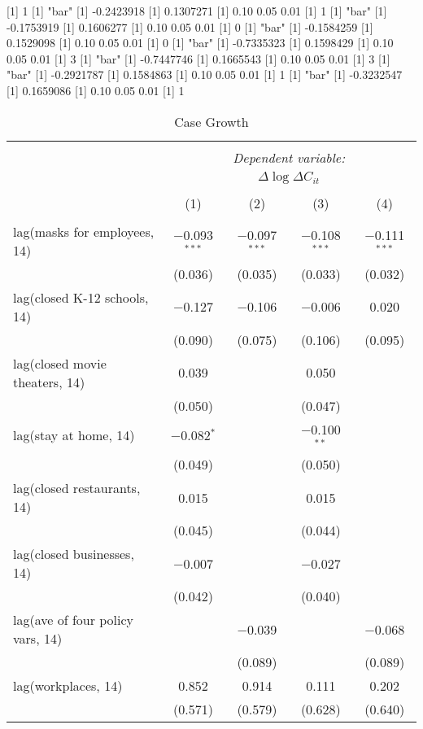 [1] 1
[1] "bar"
[1] -0.2423918
[1] 0.1307271
[1] 0.10 0.05 0.01
[1] 1
[1] "bar"
[1] -0.1753919
[1] 0.1606277
[1] 0.10 0.05 0.01
[1] 0
[1] "bar"
[1] -0.1584259
[1] 0.1529098
[1] 0.10 0.05 0.01
[1] 0
[1] "bar"
[1] -0.7335323
[1] 0.1598429
[1] 0.10 0.05 0.01
[1] 3
[1] "bar"
[1] -0.7447746
[1] 0.1665543
[1] 0.10 0.05 0.01
[1] 3
[1] "bar"
[1] -0.2921787
[1] 0.1584863
[1] 0.10 0.05 0.01
[1] 1
[1] "bar"
[1] -0.3232547
[1] 0.1659086
[1] 0.10 0.05 0.01
[1] 1

\begin{table}[!htbp] \centering 
  \caption{Case Growth} 
  \label{} 
\begin{tabular}{@{\extracolsep{1pt}}lcccc} 
\\[-1.8ex]\hline 
\hline \\[-1.8ex] 
 & \multicolumn{4}{c}{\textit{Dependent variable:}} \\ 
\cline{2-5} 
 & \multicolumn{4}{c}{$\Delta \log \Delta C_{it}$} \\ 
\\[-1.8ex] & (1) & (2) & (3) & (4)\\ 
\hline \\[-1.8ex] 
 lag(masks for employees, 14) & $-$0.093$^{***}$ & $-$0.097$^{***}$ & $-$0.108$^{***}$ & $-$0.111$^{***}$ \\ 
  & (0.036) & (0.035) & (0.033) & (0.032) \\ 
  lag(closed K-12 schools, 14) & $-$0.127 & $-$0.106 & $-$0.006 & 0.020 \\ 
  & (0.090) & (0.075) & (0.106) & (0.095) \\ 
  lag(closed movie theaters, 14) & 0.039 &  & 0.050 &  \\ 
  & (0.050) &  & (0.047) &  \\ 
  lag(stay at home, 14) & $-$0.082$^{*}$ &  & $-$0.100$^{**}$ &  \\ 
  & (0.049) &  & (0.050) &  \\ 
  lag(closed restaurants, 14) & 0.015 &  & 0.015 &  \\ 
  & (0.045) &  & (0.044) &  \\ 
  lag(closed businesses, 14) & $-$0.007 &  & $-$0.027 &  \\ 
  & (0.042) &  & (0.040) &  \\ 
  lag(ave of four policy vars, 14) &  & $-$0.039 &  & $-$0.068 \\ 
  &  & (0.089) &  & (0.089) \\ 
  lag(workplaces, 14) & 0.852 & 0.914 & 0.111 & 0.202 \\ 
  & (0.571) & (0.579) & (0.628) & (0.640) \\ 

\end{tabular}
\end{table}
